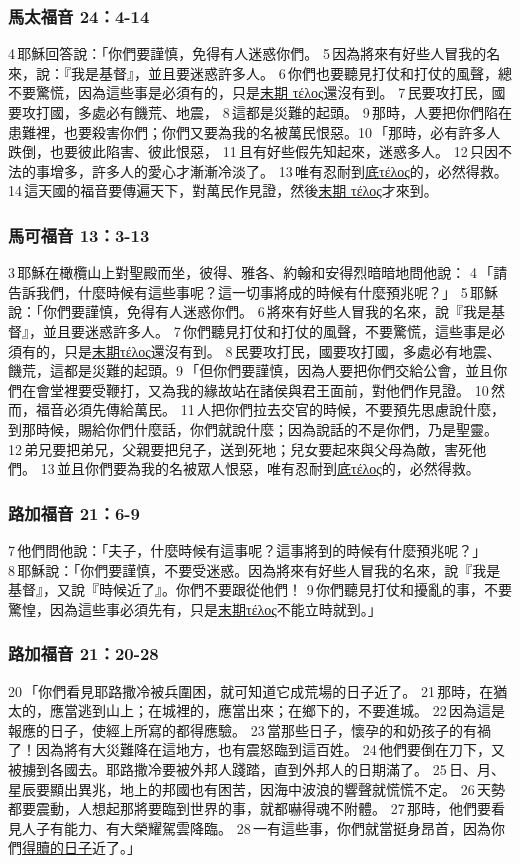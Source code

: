 \subsubsection{馬太福音 24：4-14}
 4 耶穌回答說：「你們要謹慎，免得有人迷惑你們。 5 因為將來有好些人冒我的名來，說：『我是基督』，並且要迷惑許多人。 6 你們也要聽見打仗和打仗的風聲，總不要驚慌，因為這些事是必須有的，只是\underline{末期 τέλος}還沒有到。 7 民要攻打民，國要攻打國，多處必有饑荒、地震， 8 這都是災難的起頭。 9 那時，人要把你們陷在患難裡，也要殺害你們；你們又要為我的名被萬民恨惡。10 「那時，必有許多人跌倒，也要彼此陷害、彼此恨惡， 11 且有好些假先知起來，迷惑多人。 12 只因不法的事增多，許多人的愛心才漸漸冷淡了。 13 唯有忍耐到\underline{底τέλος}的，必然得救。 14 這天國的福音要傳遍天下，對萬民作見證，然後\underline{末期 τέλος}才來到。

\subsubsection{馬可福音 13：3-13}
3 耶穌在橄欖山上對聖殿而坐，彼得、雅各、約翰和安得烈暗暗地問他說： 4 「請告訴我們，什麼時候有這些事呢？這一切事將成的時候有什麼預兆呢？」 5 耶穌說：「你們要謹慎，免得有人迷惑你們。 6 將來有好些人冒我的名來，說『我是基督』，並且要迷惑許多人。 7 你們聽見打仗和打仗的風聲，不要驚慌，這些事是必須有的，只是\underline{末期τέλος}還沒有到。 8 民要攻打民，國要攻打國，多處必有地震、饑荒，這都是災難的起頭。9 「但你們要謹慎，因為人要把你們交給公會，並且你們在會堂裡要受鞭打，又為我的緣故站在諸侯與君王面前，對他們作見證。 10 然而，福音必須先傳給萬民。 11 人把你們拉去交官的時候，不要預先思慮說什麼，到那時候，賜給你們什麼話，你們就說什麼；因為說話的不是你們，乃是聖靈。 12 弟兄要把弟兄，父親要把兒子，送到死地；兒女要起來與父母為敵，害死他們。 13 並且你們要為我的名被眾人恨惡，唯有忍耐到\underline{底τέλος}的，必然得救。

\subsubsection{路加福音 21：6-9}
7 他們問他說：「夫子，什麼時候有這事呢？這事將到的時候有什麼預兆呢？」 8 耶穌說：「你們要謹慎，不要受迷惑。因為將來有好些人冒我的名來，說『我是基督』，又說『時候近了』。你們不要跟從他們！ 9 你們聽見打仗和擾亂的事，不要驚惶，因為這些事必須先有，只是\underline{末期τέλος}不能立時就到。」
\subsubsection{路加福音 21：20-28}
20 「你們看見耶路撒冷被兵圍困，就可知道它成荒場的日子近了。 21 那時，在猶太的，應當逃到山上；在城裡的，應當出來；在鄉下的，不要進城。 22 因為這是報應的日子，使經上所寫的都得應驗。 23 當那些日子，懷孕的和奶孩子的有禍了！因為將有大災難降在這地方，也有震怒臨到這百姓。 24 他們要倒在刀下，又被擄到各國去。耶路撒冷要被外邦人踐踏，直到外邦人的日期滿了。 25 日、月、星辰要顯出異兆，地上的邦國也有困苦，因海中波浪的響聲就慌慌不定。 26 天勢都要震動，人想起那將要臨到世界的事，就都嚇得魂不附體。 27 那時，他們要看見人子有能力、有大榮耀駕雲降臨。 28 一有這些事，你們就當挺身昂首，因為你們\underline{得贖的日子}近了。」

